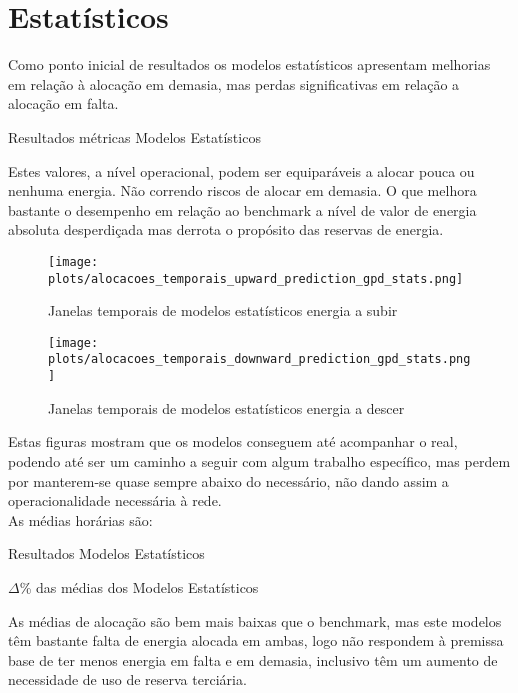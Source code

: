 \section{Estatísticos \label{se:resstats}}
Como ponto inicial de resultados os modelos estatísticos apresentam melhorias em relação à alocação em demasia, mas perdas significativas em relação a alocação em falta.\\

\begin{table}[H]
    \caption{Resultados métricas Modelos Estatísticos}    
    \resizebox{\linewidth}{!}{}
    \label{tab:statsmetrics}
    \end{table}

Estes valores, a nível operacional, podem ser equiparáveis a alocar pouca ou nenhuma energia. Não correndo riscos de alocar em demasia. O que melhora bastante o desempenho em relação ao benchmark a nível de valor de energia absoluta desperdiçada mas derrota o propósito das reservas de energia.\\

\begin{figure}[H]
    \centering
    \texttt{[image: plots/alocacoes\_temporais\_upward\_prediction\_gpd\_stats.png]}
    \caption{Janelas temporais de modelos estatísticos energia a subir}
    \label{fig:statstimewindowsup}
\end{figure}


\begin{figure}[H]
    \centering
    \texttt{[image: plots/alocacoes\_temporais\_downward\_prediction\_gpd\_stats.png]}
    \caption{Janelas temporais de modelos estatísticos energia a descer}
    \label{fig:statstimewindowsdown}
\end{figure}

Estas figuras mostram que os modelos conseguem até acompanhar o real, podendo até ser um caminho a seguir com algum trabalho específico, mas perdem por manterem-se quase sempre abaixo do necessário, não dando assim a operacionalidade necessária à rede.\\
As médias horárias são:\\
\begin{table}[H]
    \caption{Resultados Modelos Estatísticos}    
    \resizebox{\linewidth}{!}{}
    \label{tab:statsres}
    \end{table}



\begin{table}[H]
    \caption{$\Delta$\% das médias dos Modelos Estatísticos}    
    \resizebox{\linewidth}{!}{}
    \label{tab:statsres_deltas}
    \end{table}

As médias de alocação são bem mais baixas que o benchmark, mas este modelos têm bastante falta de energia alocada em ambas, logo não respondem à premissa base de ter menos energia em falta e em demasia, inclusivo têm um aumento de necessidade de uso de reserva terciária.\\

